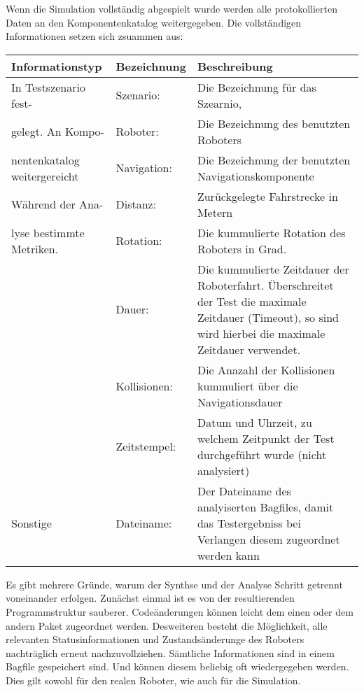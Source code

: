 Wenn die Simulation vollständig abgespielt wurde werden alle protokollierten Daten an den Komponentenkatalog weitergegeben. Die vollständigen Informationen setzen sich zsuammen aus:
\newline \newline
\begin{tabular}{ p{3.6cm}|p{2.5cm}|p{6.9cm} }
\hline
Informationstyp & Bezeichnung & Beschreibung \\ \hline
\rule{0pt}{3ex} In Testszenario fest-
 & Szenario: & Die Bezeichnung für das Szearnio,  \\
 gelegt. An Kompo-
 & Roboter: & Die Bezeichnung des benutzten Roboters \\
 nentenkatalog weitergereicht
 & Navigation: & Die Bezeichnung der benutzten Navigationskomponente \\ 
 \hline
Während der Ana-
 & Distanz: & Zurückgelegte Fahrstrecke in Metern \\
 lyse bestimmte Metriken.
 & Rotation: & Die kummulierte Rotation des Roboters in Grad. \\
 & Dauer: & Die kummulierte Zeitdauer der Roboterfahrt. Überschreitet der Test die maximale Zeitdauer (Timeout), so sind wird hierbei die maximale Zeitdauer verwendet. \\
 & Kollisionen: & Die Anazahl der Kollisionen kummuliert über die Navigationsdauer \\
 & Zeitstempel: & Datum und Uhrzeit, zu welchem Zeitpunkt der Test durchgeführt wurde (nicht analysiert) \\

Sonstige
 & Dateiname: & Der Dateiname des analyiserten Bagfiles, damit das Testergebniss bei Verlangen diesem zugeordnet werden kann \\
\hline
\end{tabular}
\newline \newline


Es gibt mehrere Gründe, warum der Synthse und der Analyse Schritt getrennt voneinander erfolgen. Zunächst einmal ist es von der resultierenden Programmstruktur sauberer. Codeänderungen können leicht dem einen oder dem andern Paket zugeordnet werden. Desweiteren besteht die Möglichkeit, alle relevanten Statusinformationen und Zustandsänderunge des Roboters nachträglich erneut nachzuvollziehen. Sämtliche Informationen sind in einem Bagfile gespeichert sind. Und können diesem beliebig oft wiedergegeben werden. Dies gilt sowohl für den realen Roboter, wie auch für die Simulation. 

